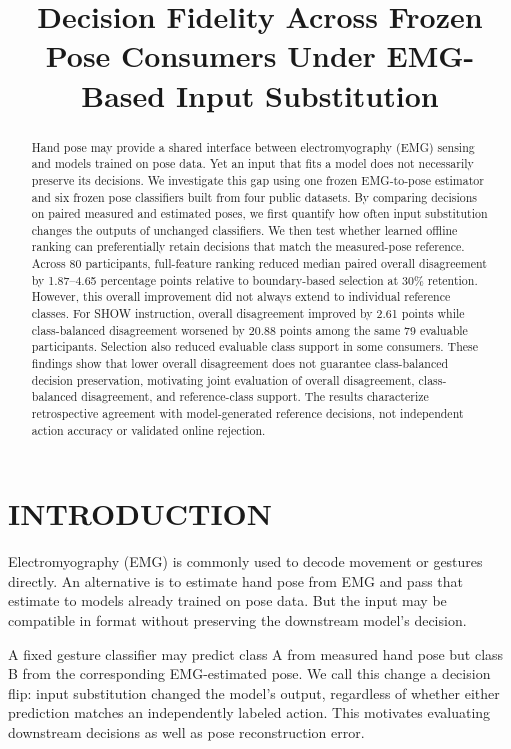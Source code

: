 \documentclass[conference,letterpaper]{IEEEtran}
\title{Decision Fidelity Across Frozen Pose Consumers Under EMG-Based Input Substitution}
\author{\IEEEauthorblockN{Boyan Dong}\IEEEauthorblockA{\textit{School of Biological Science and Medical Engineering}\\\textit{Southeast University}\\Nanjing, China\\yan494815@gmail.com}}
\begin{document}
\raggedbottom
\maketitle
\begin{abstract}
Hand pose may provide a shared interface between electromyography (EMG) sensing and models trained on pose data. Yet an input that fits a model does not necessarily preserve its decisions. We investigate this gap using one frozen EMG-to-pose estimator and six frozen pose classifiers built from four public datasets. By comparing decisions on paired measured and estimated poses, we first quantify how often input substitution changes the outputs of unchanged classifiers. We then test whether learned offline ranking can preferentially retain decisions that match the measured-pose reference. Across 80 participants, full-feature ranking reduced median paired overall disagreement by 1.87--4.65 percentage points relative to boundary-based selection at 30\% retention. However, this overall improvement did not always extend to individual reference classes. For SHOW instruction, overall disagreement improved by 2.61 points while class-balanced disagreement worsened by 20.88 points among the same 79 evaluable participants. Selection also reduced evaluable class support in some consumers. These findings show that lower overall disagreement does not guarantee class-balanced decision preservation, motivating joint evaluation of overall disagreement, class-balanced disagreement, and reference-class support. The results characterize retrospective agreement with model-generated reference decisions, not independent action accuracy or validated online rejection.
\end{abstract}

\section{INTRODUCTION}\label{introduction}
Electromyography (EMG) is commonly used to decode movement or gestures directly. An alternative is to estimate hand pose from EMG and pass that estimate to models already trained on pose data. But the input may be compatible in format without preserving the downstream model's decision.

A fixed gesture classifier may predict class A from measured hand pose but class B from the corresponding EMG-estimated pose. We call this change a decision flip: input substitution changed the model's output, regardless of whether either prediction matches an independently labeled action. This motivates evaluating downstream decisions as well as pose reconstruction error.
\end{document}
